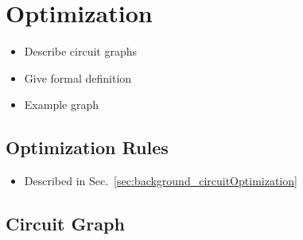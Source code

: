 \section{Optimization}
\begin{itemize}
    \item Describe circuit graphs
    \item Give formal definition
    \item Example graph
\end{itemize}

\subsection{Optimization Rules}
\begin{itemize}
    \item Described in Sec.~\ref{sec:background_circuitOptimization}
\end{itemize}

\subsection{Circuit Graph}
\label{sec:concept_circuitGraph}

